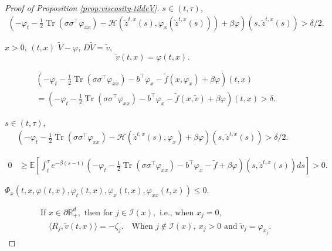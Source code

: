 \documentclass[11pt]{article}
\theoremstyle{definition}
\theoremstyle{plain}
\begin{document}
\begin{proof}[Proof of Proposition \ref{prop:viscosity-tildeV}]
 $s \in (t, \tau)$, 
\begin{align}
\left( -\varphi_t - \tfrac{1}{2} \operatorname{Tr}(\sigma \sigma^{\top} \varphi_{xx}) - \mathcal{H}(\tilde{z}^{t,x}(s), \varphi_x(\tilde{z}^{t,x}(s))) + \beta \varphi \right)
(s, \tilde{z}^{t,x}(s)) > \delta/2.
\end{align}

 $x > 0$,  $(t,x)$  $\tilde{V} - \varphi$,  $D \tilde{V} = \tilde{v}$,  
\[
\tilde{v}(t,x) = \varphi(t,x).
\]

\begin{align}
&\left( -\varphi_t - \tfrac{1}{2} \operatorname{Tr}(\sigma \sigma^{\top} \varphi_{xx}) - b^{\top} \varphi_x - \tilde{f}(x, \varphi_x) + \beta \varphi \right)(t,x) \\
&= \left( -\varphi_t - \tfrac{1}{2} \operatorname{Tr}(\sigma \sigma^{\top} \varphi_{xx}) - b^{\top} \varphi_x - \tilde{f}(x, \tilde{v}) + \beta \varphi \right)(t,x) > \delta.
\end{align}

 $s \in (t, \tau)$,
\begin{align}
\left( -\varphi_t - \tfrac{1}{2} \operatorname{Tr}(\sigma \sigma^{\top} \varphi_{xx}) - \mathcal{H}(\tilde{z}^{t,x}(s), \varphi_x) + \beta \varphi \right)(s, \tilde{z}^{t,x}(s)) > \delta/2.
\end{align}

\begin{align}
0 &\geq \mathbb{E} \left[ \int_t^{\tau} e^{-\beta(s - t)} \left( -\varphi_t - \tfrac{1}{2} \operatorname{Tr}(\sigma \sigma^{\top} \varphi_{xx}) - b^{\top} \varphi_x - \tilde{f} + \beta \varphi \right)(s, \tilde{z}^{t,x}(s)) ds \right] > 0.
\end{align}

 $\Phi_x(t,x,\varphi(t,x), \varphi_t(t,x), \varphi_x(t,x), \varphi_{xx}(t,x)) \leq 0$.

\begin{align*}
&\text{If } x \in \partial \mathbb{R}_+^d, \text{ then for } j \in \mathcal{I}(x), \text{ i.e., when } x_j = 0, \\
&\quad \langle R_j, \tilde{v}(t,x) \rangle = -\zeta_j. \quad \text{When } j \notin \mathcal{I}(x),\ x_j > 0 \text{ and } \tilde{v}_j = \varphi_{x_j}.
\end{align*}


\end{proof}
\end{document}
